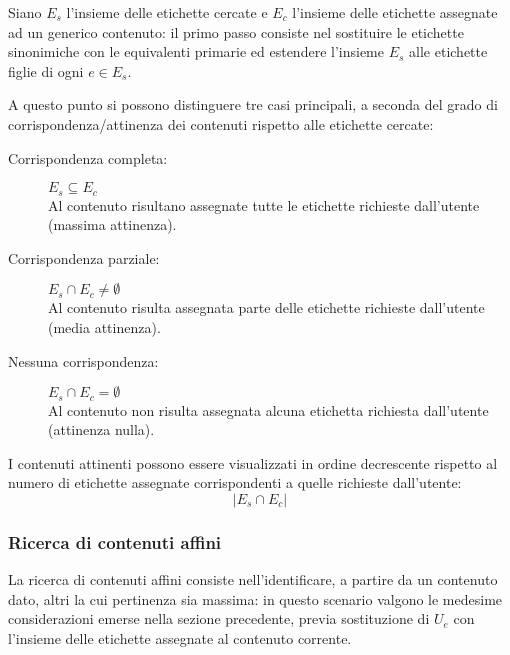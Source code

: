 \documentclass[10pt,a4paper,headinclude,footinclude,hidelinks]{scrreprt} %
\begin{document}
	Siano $E_s$ l'insieme delle etichette cercate e $E_c$ l'insieme delle etichette assegnate ad un generico contenuto: il primo passo consiste nel sostituire le etichette sinonimiche con le equivalenti primarie ed estendere l'insieme $E_s$ alle etichette figlie di ogni $e \in E_s$.

	A questo punto si possono distinguere tre casi principali, a seconda del grado di corrispondenza/attinenza dei contenuti rispetto alle etichette cercate:
	\begin{description}
	\item[Corrispondenza completa:] $E_s \subseteq E_c$ \hfill \\
	Al contenuto risultano assegnate tutte le etichette richieste dall'utente (massima attinenza).
 	\item[Corrispondenza parziale:] $E_s \cap E_c \neq \emptyset$ \hfill \\
	Al contenuto risulta assegnata parte delle etichette richieste dall'utente (media attinenza).
	\item[Nessuna corrispondenza:] $E_s \cap E_c = \emptyset$\hfill \\
	Al contenuto non risulta assegnata alcuna etichetta richiesta dall'utente (attinenza nulla).
	\end{description}

	I contenuti attinenti possono essere visualizzati in ordine decrescente rispetto al numero di etichette assegnate corrispondenti a quelle richieste dall'utente:
	$$\left|{E_s \cap E_c}\right|$$

	\subsubsection{Ricerca di contenuti affini}
	La ricerca di contenuti affini consiste nell'identificare, a partire da un contenuto dato, altri la cui pertinenza sia massima: in questo scenario valgono le medesime considerazioni emerse nella sezione precedente, previa sostituzione di $U_e$ con l'insieme delle etichette assegnate al contenuto corrente.

\end{document}
